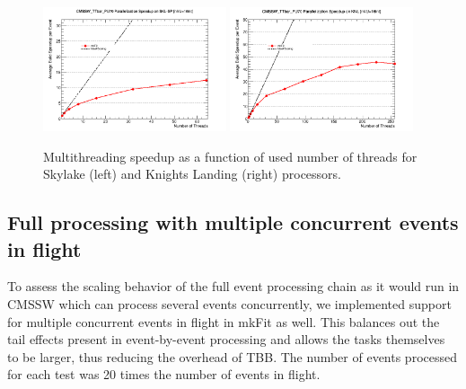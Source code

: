 \documentclass{webofc}
\def\mkfit{mkFit\xspace}
\def\twop{0.48\textwidth}
\def\postfigskip{\vskip-4mm}
\begin{document}
\begin{figure}[htb]
  \centering
  \includegraphics[width=\twop]{figs/comp/SKL-SP_CMSSW_TTbar_PU70_TH_speedup.png}
  \hfill
  \includegraphics[width=\twop]{figs/comp/KNL_CMSSW_TTbar_PU70_TH_speedup.png}
  \postfigskip

  \caption{Multithreading speedup as a function of used number of threads for
    Skylake (left) and Knights Landing (right) processors.}
  \label{fig:th-speedup}
\end{figure}


\subsection{Full processing with multiple concurrent events in flight}

To assess the scaling behavior of the full event processing chain as it would
run in CMSSW which can process several events concurrently, we implemented
support for multiple concurrent events in flight in \mkfit as well. This
balances out the tail effects present in event-by-event processing and allows
the tasks themselves to be larger, thus reducing the overhead of TBB. The 
number of events processed for each test was 20 times the number of events in 
flight. 
\end{document}
